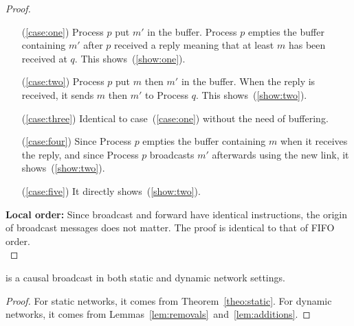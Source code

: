 \begin{proof}
  \begin{itemize}
  \item [(\ref{case:one})] Process $p$ put $m'$ in the buffer. Process $p$
    empties the buffer containing $m'$ after $p$ received a reply
    meaning that at least $m$ has been received at $q$. This
    shows~(\ref{show:one}).
  \item [(\ref{case:two})] Process $p$ put $m$ then $m'$ in the buffer. When the
    reply is received, it sends $m$ then $m'$ to Process $q$. This
    shows~(\ref{show:two}).
  \item [(\ref{case:three})] Identical to case~(\ref{case:one}) without the need
    of buffering.
  \item [(\ref{case:four})] Since Process $p$ empties the buffer containing $m$
    when it receives the reply, and since Process $p$ broadcasts $m'$
    afterwards using the new link, it shows~(\ref{show:two}).
  \item [(\ref{case:five})] It directly shows~(\ref{show:two}).
  \end{itemize}
  \textbf{Local order:} Since broadcast and forward have identical instructions,
  the origin of broadcast messages does not matter. The proof is identical to
  that
  of FIFO order. \\
\end{proof}

\begin{theorem}
  \CBROADCAST is a causal broadcast in both static and dynamic network settings.
\end{theorem}

\begin{proof}
  For static networks, it comes from Theorem~\ref{theo:static}. For dynamic
  networks, it comes from Lemmas~\ref{lem:removals}~and~\ref{lem:additions}.
\end{proof}


